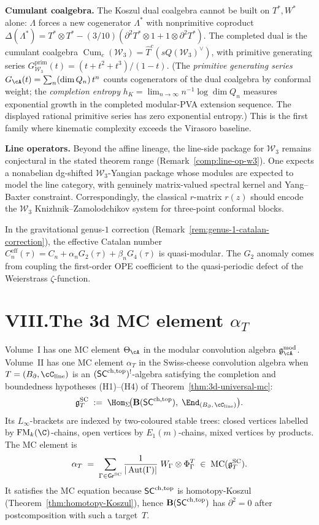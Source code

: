 \smallskip
\noindent\textbf{Cumulant coalgebra.}\enspace
The Koszul dual coalgebra cannot be built on $T^*, W^*$ alone:
$\Lambda$ forces a new cogenerator $\Lambda^*$ with nonprimitive
coproduct $\Delta(\Lambda^*) = T^* \otimes T^* -
(3/10)(\partial^2 T^* \otimes 1 + 1 \otimes \partial^2 T^*)$.
The completed dual is the cumulant coalgebra
$\operatorname{Cum}_c(\mathcal{W}_3) =
\hat{T}^c(sQ(\mathcal{W}_3)^\vee)$, with primitive generating
series
$G_{\mathcal{W}_3}^{\mathrm{prim}}(t) = (t + t^2 + t^3)/(1 - t)$.
(The \emph{primitive generating series} $G_\cA(t) = \sum_n (\dim Q_n)\, t^n$
counts cogenerators of the dual coalgebra by conformal weight;
the \emph{completion entropy} $h_K = \lim_{n\to\infty} n^{-1}\log\dim Q_n$
measures exponential growth in the completed modular-PVA extension
sequence. The displayed rational primitive series has zero
exponential entropy.)
This is
the first family where kinematic complexity exceeds the Virasoro
baseline.

\smallskip
\noindent\textbf{Line operators.}\enspace
Beyond the affine lineage, the line-side package for
$\mathcal{W}_3$ remains conjectural in the stated theorem range
\textup{(}Remark~\textup{\ref{comp:line-op-w3}}\textup{)}. One
expects a nonabelian dg-shifted $\mathcal{W}_3$-Yangian package
whose modules are expected to model the line category, with genuinely matrix-valued spectral
kernel and Yang--Baxter constraint. Correspondingly, the
classical $r$-matrix $r(z)$ should encode the $\mathcal{W}_3$
Knizhnik--Zamolodchikov system for three-point conformal blocks.

In the gravitational genus-$1$ correction
\textup{(}Remark~\ref{rem:genus-1-catalan-correction}\textup{)}, the
effective Catalan number
$C_n^{\mathrm{eff}}(\tau)=C_n+\alpha_nG_2(\tau)+\beta_nG_4(\tau)$ is
quasi-modular. The $G_2$ anomaly comes from coupling the first-order
OPE coefficient to the quasi-periodic defect of the Weierstrass
$\zeta$-function.


\section*{VIII.\quad The 3d MC element $\alpha_T$}

Volume~I has one MC element $\Theta_\cA$ in the modular
convolution algebra $\gAmod$. Volume~II has one MC element
$\alpha_T$ in the Swiss-cheese convolution algebra
when $T=(\Bbound,\cC_{\mathrm{line}})$ is an
$(\mathsf{SC}^{\mathrm{ch,top}})^!$-algebra satisfying the completion and boundedness
hypotheses (H1)--(H4) of Theorem~\ref{thm:3d-universal-mc}:
\[
\gSC_T
\;:=\;
\Hom_\Sigma\!\bigl(
 \mathbf{B}(\SCchtop),\;
 \End_{(\Bbound,\,\cC_{\mathrm{line}})}
\bigr).
\]
Its $L_\infty$-brackets are indexed by two-coloured stable trees:
closed vertices labelled by $\FM_k(\C)$-chains, open vertices by
$E_1(m)$-chains, mixed vertices by products. The MC element is
\[
\alpha_T
\;=\;
\sum_{\Gamma \in \mathsf{Gr}^{\mathrm{SC}}}
\frac{1}{|\operatorname{Aut}(\Gamma)|}
\;W_\Gamma \otimes \Phi_\Gamma^T
\;\in\;
\operatorname{MC}(\mathfrak{g}^{\mathrm{SC}}_T).
\]
It satisfies the MC equation because $\mathsf{SC}^{\mathrm{ch,top}}$ is homotopy-Koszul
(Theorem~\ref{thm:homotopy-Koszul}), hence
$\mathbf{B}(\mathsf{SC}^{\mathrm{ch,top}})$ has $\partial^2 = 0$ after postcomposition
with such a target~$T$.

